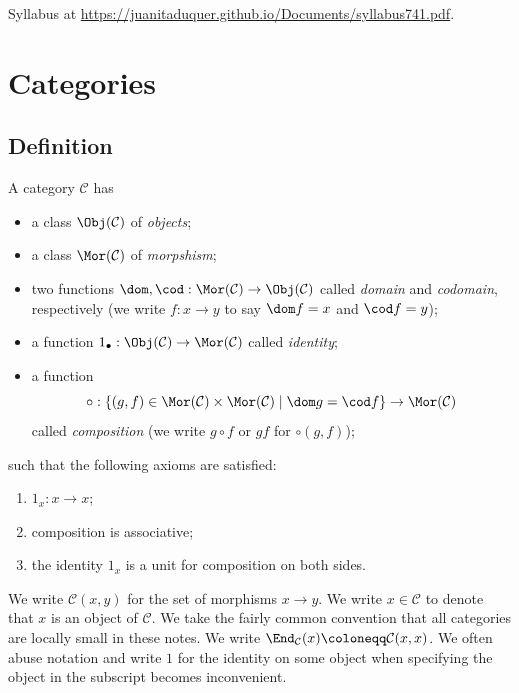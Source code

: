 
Syllabus at \url{https://juanitaduquer.github.io/Documents/syllabus741.pdf}.

\chapter{Categories}

\section{Definition}

\begin{definition}\label{1.1.1}
	A category $\mathcal{C} $ has
	\begin{itemize}
		\item a class $\Obj(\mathcal{C} ) $ of \emph{objects};
		\item a class $\Mor(\mathcal{C} )$ of \emph{morpshism};
		\item two functions $\dom, \cod : \Mor(\mathcal{C} ) \to \Obj(\mathcal{C} ) $ called \emph{domain} and \emph{codomain}, respectively (we write $f : x \to y$ to say $\dom f = x$ and $\cod f = y$);
		\item a function $1_{\bullet} : \Obj(\mathcal{C} )  \to \Mor(\mathcal{C} )$ called \emph{identity};
		\item a function
			\[
				\circ : \left\{ (g,f)\in\Mor(\mathcal{C} )\times \Mor(\mathcal{C} )\mid \dom g = \cod f \right\}  \to \Mor(\mathcal{C} )
		\]
		called \emph{composition} (we write $g\circ f$ or $gf$ for $\circ (g,f)$);	
	\end{itemize}
	such that the following axioms are satisfied:
	\begin{enumerate}
		\item $1_x : x \to x$;
		\item composition is associative;
		\item the identity $1_x$ is a unit for composition on both sides.
	\end{enumerate}
\end{definition}

We write $\mathcal{C} (x,y)$ for the set of morphisms $x\to y$. We write $x\in \mathcal{C} $ to denote that $x$ is an object of $\mathcal{C} $. We take the fairly common convention that all categories are locally small in these notes. We write $\End_{\mathcal{C} }(x) \coloneqq \mathcal{C} (x,x)$. We often abuse notation and write $1$ for the identity on some object when specifying the object in the subscript becomes inconvenient.

